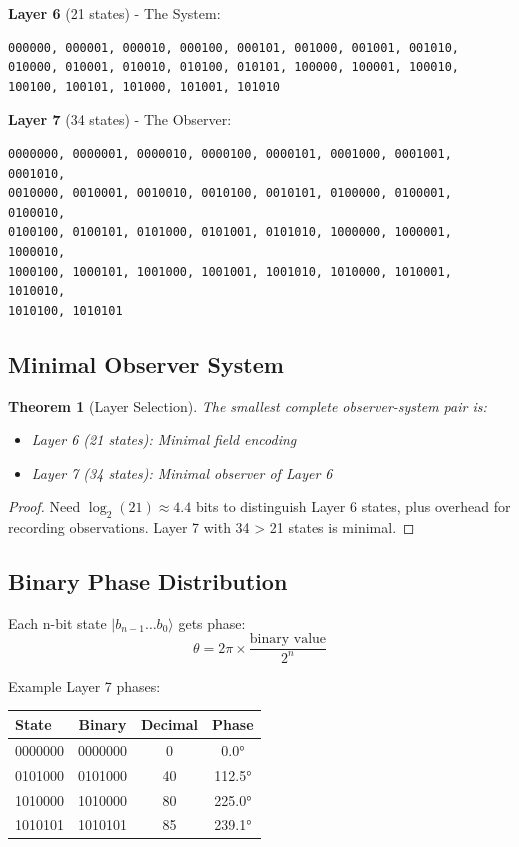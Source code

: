 \documentclass[%
 reprint,
 amsmath,amssymb,
 aps,
 prd,
 10pt,
 nofootinbib,      %
 longbibliography  %
]{revtex4-2}
\newtheorem{theorem}{Theorem}[section]
\theoremstyle{definition}
\theoremstyle{remark}
\begin{document}
\textbf{Layer 6} (21 states) - The System:
\begin{verbatim}
000000, 000001, 000010, 000100, 000101, 001000, 001001, 001010,
010000, 010001, 010010, 010100, 010101, 100000, 100001, 100010,
100100, 100101, 101000, 101001, 101010
\end{verbatim}

\textbf{Layer 7} (34 states) - The Observer:
\begin{verbatim}
0000000, 0000001, 0000010, 0000100, 0000101, 0001000, 0001001, 0001010,
0010000, 0010001, 0010010, 0010100, 0010101, 0100000, 0100001, 0100010,
0100100, 0100101, 0101000, 0101001, 0101010, 1000000, 1000001, 1000010,
1000100, 1000101, 1001000, 1001001, 1001010, 1010000, 1010001, 1010010,
1010100, 1010101
\end{verbatim}

\subsection{Minimal Observer System}

\begin{theorem}[Layer Selection]
The smallest complete observer-system pair is:
\begin{itemize}
\item Layer 6 (21 states): Minimal field encoding
\item Layer 7 (34 states): Minimal observer of Layer 6
\end{itemize}
\end{theorem}

\begin{proof}
Need $\log_2(21) \approx 4.4$ bits to distinguish Layer 6 states, plus overhead for recording observations. Layer 7 with 34 > 21 states is minimal.
\end{proof}

\subsection{Binary Phase Distribution}

Each n-bit state $|b_{n-1}\ldots b_0\rangle$ gets phase:
\begin{equation}
\theta = 2\pi \times \frac{\text{binary value}}{2^n}
\end{equation}

Example Layer 7 phases:
\begin{center}
\begin{tabular}{lccc}
\toprule
State & Binary & Decimal & Phase \\
\midrule
0000000 & 0000000 & 0 & 0.0° \\
0101000 & 0101000 & 40 & 112.5° \\
1010000 & 1010000 & 80 & 225.0° \\
1010101 & 1010101 & 85 & 239.1° \\
\bottomrule
\end{tabular}
\end{center}
\end{document}
